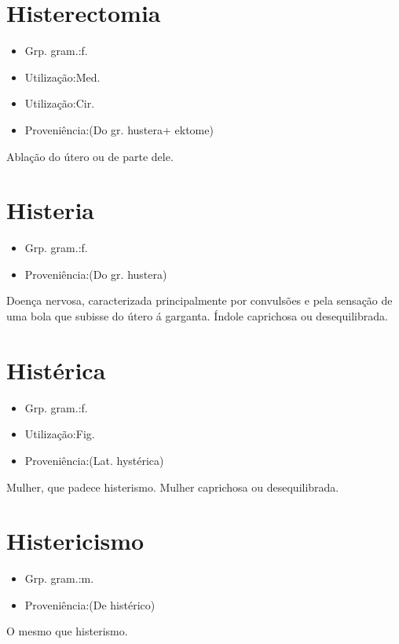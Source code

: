 \documentclass{article}
\begin{document}
\section{Histerectomia}
\begin{itemize}
\item {Grp. gram.:f.}
\end{itemize}
\begin{itemize}
\item {Utilização:Med.}
\end{itemize}
\begin{itemize}
\item {Utilização:Cir.}
\end{itemize}
\begin{itemize}
\item {Proveniência:(Do gr. \textunderscore hustera\textunderscore  + \textunderscore ektome\textunderscore )}
\end{itemize}
Ablação do útero ou de parte dele.
\section{Histeria}
\begin{itemize}
\item {Grp. gram.:f.}
\end{itemize}
\begin{itemize}
\item {Proveniência:(Do gr. \textunderscore hustera\textunderscore )}
\end{itemize}
Doença nervosa, caracterizada principalmente por convulsões e pela sensação de uma bola que subisse do útero á garganta.
Índole caprichosa ou desequilibrada.
\section{Histérica}
\begin{itemize}
\item {Grp. gram.:f.}
\end{itemize}
\begin{itemize}
\item {Utilização:Fig.}
\end{itemize}
\begin{itemize}
\item {Proveniência:(Lat. \textunderscore hystérica\textunderscore )}
\end{itemize}
Mulher, que padece histerismo.
Mulher caprichosa ou desequilibrada.
\section{Histericismo}
\begin{itemize}
\item {Grp. gram.:m.}
\end{itemize}
\begin{itemize}
\item {Proveniência:(De \textunderscore histérico\textunderscore )}
\end{itemize}
O mesmo que \textunderscore histerismo\textunderscore .
\end{document}

